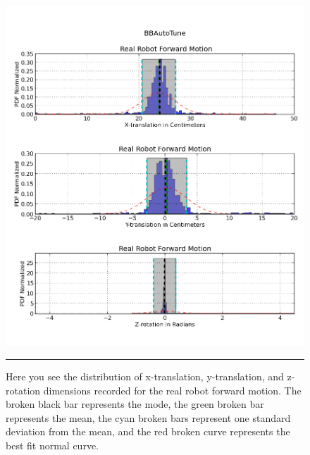 
\begin{figure}[htbp]
\centering
\includegraphics[scale=0.6]{../Figures/Chapter4/real_robot_forward_dist.png}
\rule{35em}{0.5pt}
\caption[Real Robot Forward Motion Distributions]{Here you see the distribution of x-translation, y-translation, and z-rotation dimensions recorded for the real robot forward motion. The broken black bar represents the mode, the green broken bar represents the mean, the cyan broken bars represent one standard deviation from the mean, and the red broken curve represents the best fit normal curve.}
\label{fig:real_robot_forward_dist}
\end{figure}

